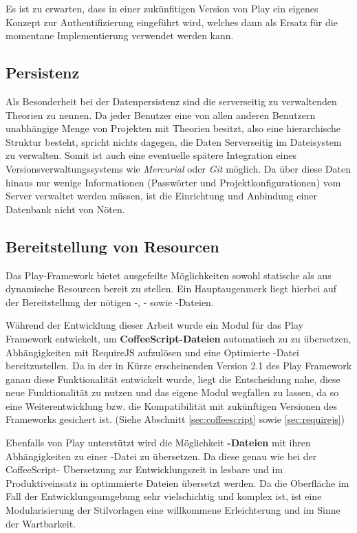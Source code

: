 Es ist zu erwarten, dass in einer zukünfitigen Version von Play ein eigenes Konzept zur
Authentifizierung eingeführt wird, welches dann als Ersatz für die momentane Implementierung
verwendet werden kann.

\subsection{Persistenz}

Als Besonderheit bei der Datenpersistenz sind die serverseitig zu verwaltenden Theorien zu nennen.
Da jeder Benutzer eine von allen anderen Benutzern unabhängige Menge von Projekten mit Theorien
besitzt, also eine hierarchische Struktur besteht, spricht nichts dagegen, die Daten Serverseitig im
Dateisystem zu verwalten. Somit ist auch eine eventuelle spätere Integration eines
Versionsverwaltungssystems wie \textit{Mercurial} oder \textit{Git} möglich. Da über diese Daten
hinaus nur wenige Informationen (Passwörter und Projektkonfigurationen) vom Server verwaltet werden
müssen, ist die Einrichtung und Anbindung einer Datenbank nicht von Nöten.

\subsection{Bereitstellung von Resourcen}

Das Play-Framework bietet ausgefeilte Möglichkeiten sowohl statische als aus dynamische Resourcen
bereit zu stellen. Ein Hauptaugenmerk liegt hierbei auf der Bereitstellung der nötigen -,
- sowie -Dateien.

Während der Entwicklung dieser Arbeit wurde ein Modul für das Play Framework entwickelt, um \textbf
{CoffeeScript-Dateien} automatisch zu  zu übersetzen, Abhängigkeiten mit RequireJS
aufzulösen und eine Optimierte -Datei bereitzustellen. Da in der in Kürze erscheinenden
Version 2.1 des Play Framework ganau diese Funktionalität entwickelt wurde, liegt die Entscheidung
nahe, diese neue Funktionalität zu nutzen und das eigene Modul wegfallen zu lassen, da so eine
Weiterentwicklung bzw. die Kompatibilität mit zukünftigen Versionen des Frameworks gesichert ist.
(Siehe Abschnitt \ref{sec:coffeescript} sowie \ref{sec:requirejs})

Ebenfalls von Play unterstützt wird die Möglichkeit  \textbf{-Dateien} mit ihren
Abhängigkeiten zu einer -Datei zu übersetzen. Da diese genau wie bei der CoffeeScript-
Übersetzung zur Entwicklungszeit in lesbare und im Produktiveinsatz in optimmierte Dateien übersetzt
werden. Da die Oberfläche im Fall der Entwicklungsumgebung sehr vielschichtig und komplex ist, ist
eine Modularisierung der Stilvorlagen eine willkommene Erleichterung und im Sinne der Wartbarkeit.

